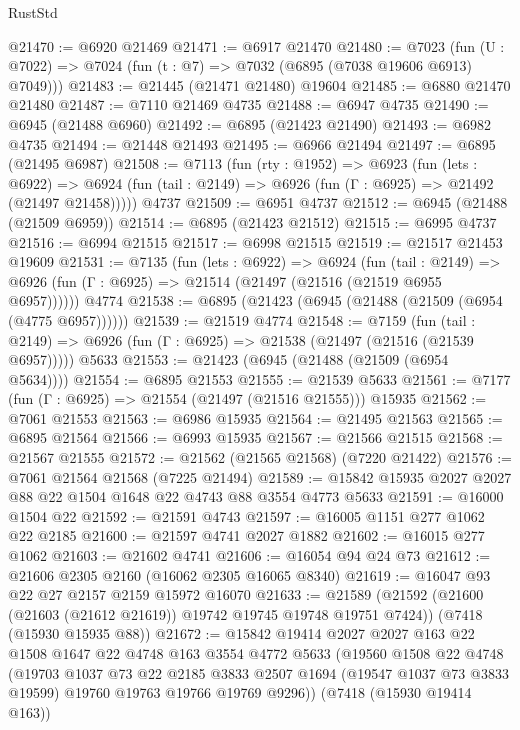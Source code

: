 \begin{lexlean}{RustStd}
\begin{coremodule}
@21470 := @6920 @21469
@21471 := @6917 @21470
@21480 := @7023
    (fun (U : @7022) => @7024 (fun (t : @7) => @7032 (@6895 (@7038 @19606 @6913) @7049)))
@21483 := @21445 (@21471 @21480) @19604
@21485 := @6880 @21470 @21480
@21487 := @7110 @21469 @4735
@21488 := @6947 @4735
@21490 := @6945 (@21488 @6960)
@21492 := @6895 (@21423 @21490)
@21493 := @6982 @4735
@21494 := @21448 @21493
@21495 := @6966 @21494
@21497 := @6895 (@21495 @6987)
@21508 := @7113
    (fun (rty : @1952) =>
    @6923
      (fun (lets : @6922) =>
      @6924 (fun (tail : @2149) => @6926 (fun (Γ : @6925) => @21492 (@21497 @21458)))))
    @4737
@21509 := @6951 @4737
@21512 := @6945 (@21488 (@21509 @6959))
@21514 := @6895 (@21423 @21512)
@21515 := @6995 @4737
@21516 := @6994 @21515
@21517 := @6998 @21515
@21519 := @21517 @21453 @19609
@21531 := @7135
    (fun (lets : @6922) =>
    @6924
      (fun (tail : @2149) =>
      @6926 (fun (Γ : @6925) => @21514 (@21497 (@21516 (@21519 @6955 @6957))))))
    @4774
@21538 := @6895 (@21423 (@6945 (@21488 (@21509 (@6954 (@4775 @6957))))))
@21539 := @21519 @4774
@21548 := @7159
    (fun (tail : @2149) => @6926 (fun (Γ : @6925) => @21538 (@21497 (@21516 (@21539 @6957)))))
    @5633
@21553 := @21423 (@6945 (@21488 (@21509 (@6954 @5634))))
@21554 := @6895 @21553
@21555 := @21539 @5633
@21561 := @7177 (fun (Γ : @6925) => @21554 (@21497 (@21516 @21555))) @15935
@21562 := @7061 @21553
@21563 := @6986 @15935
@21564 := @21495 @21563
@21565 := @6895 @21564
@21566 := @6993 @15935
@21567 := @21566 @21515
@21568 := @21567 @21555
@21572 := @21562 (@21565 @21568) (@7220 @21422)
@21576 := @7061 @21564 @21568 (@7225 @21494)
@21589 := @15842 @15935 @2027 @2027 @88 @22 @1504 @1648 @22 @4743 @88 @3554 @4773 @5633
@21591 := @16000 @1504 @22
@21592 := @21591 @4743
@21597 := @16005 @1151 @277 @1062 @22 @2185
@21600 := @21597 @4741 @2027 @1882
@21602 := @16015 @277 @1062
@21603 := @21602 @4741
@21606 := @16054 @94 @24 @73
@21612 := @21606 @2305 @2160 (@16062 @2305 @16065 @8340)
@21619 := @16047 @93 @22 @27 @2157 @2159 @15972 @16070
@21633 := @21589
    (@21592 (@21600 (@21603 (@21612 @21619)) @19742 @19745 @19748 @19751 @7424))
    (@7418 (@15930 @15935 @88))
@21672 := @15842
    @19414
    @2027
    @2027
    @163
    @22
    @1508
    @1647
    @22
    @4748
    @163
    @3554
    @4772
    @5633
    (@19560
      @1508
      @22
      @4748
      (@19703
        @1037
        @73
        @22
        @2185
        @3833
        @2507
        @1694
        (@19547 @1037 @73 @3833 @19599)
        @19760
        @19763
        @19766
        @19769
        @9296))
    (@7418 (@15930 @19414 @163))

\end{coremodule}
\end{lexlean}
